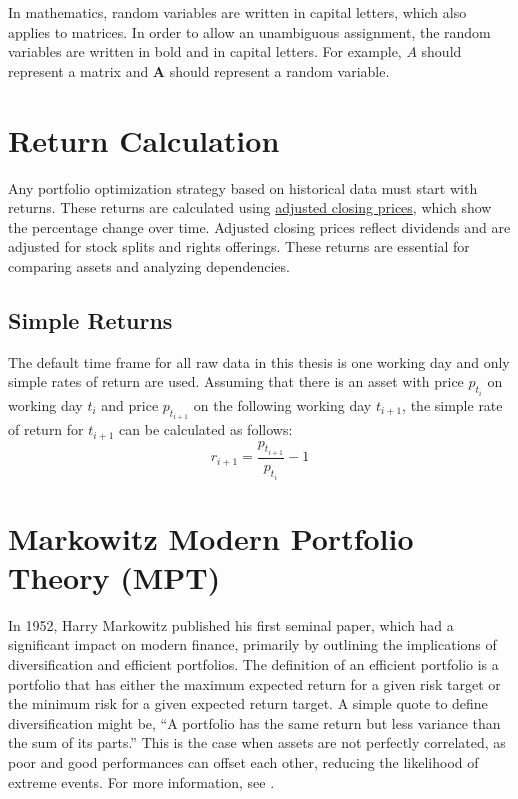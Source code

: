 \documentclass[
  oneside]{book}
\begin{document}
In mathematics, random variables are written in capital letters, which also applies to matrices. In order to allow an unambiguous assignment, the random variables are written in bold and in capital letters. For example, \(A\) should represent a matrix and \(\pmb{A}\) should represent a random variable.

\hypertarget{return-calculation}{%
\section{Return Calculation}\label{return-calculation}}

Any portfolio optimization strategy based on historical data must start with returns. These returns are calculated using \href{https://www.investopedia.com/terms/a/adjusted\%20closingprice.asp}{adjusted closing prices}, which show the percentage change over time. Adjusted closing prices reflect dividends and are adjusted for stock splits and rights offerings. These returns are essential for comparing assets and analyzing dependencies.

\hypertarget{simple-returns}{%
\subsection{Simple Returns}\label{simple-returns}}

The default time frame for all raw data in this thesis is one working day and only simple rates of return are used. Assuming that there is an asset with price \(p_{t_i}\) on working day \(t_i\) and price \(p_{t_{i+1}}\) on the following working day \(t_{i+1}\), the simple rate of return for \(t_{i+1}\) can be calculated as follows:
\[
  r_{i+1} = \frac{p_{t_{i+1}}}{p_{t_i}}-1
\]

\hypertarget{markowitz-modern-portfolio-theory-mpt}{%
\section{Markowitz Modern Portfolio Theory (MPT)}\label{markowitz-modern-portfolio-theory-mpt}}

In 1952, Harry Markowitz published his first seminal paper, which had a significant impact on modern finance, primarily by outlining the implications of diversification and efficient portfolios. The definition of an efficient portfolio is a portfolio that has either the maximum expected return for a given risk target or the minimum risk for a given expected return target. A simple quote to define diversification might be, ``A portfolio has the same return but less variance than the sum of its parts.'' This is the case when assets are not perfectly correlated, as poor and good performances can offset each other, reducing the likelihood of extreme events. For more information, see \citep{Mari2005}.
\end{document}
